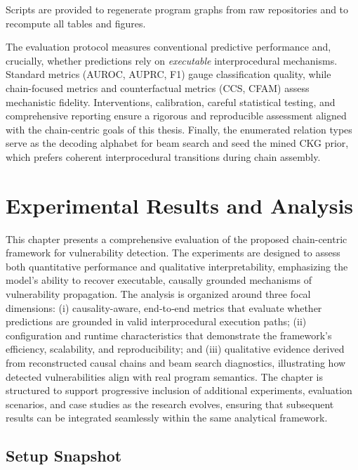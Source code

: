 \documentclass{buthesis}
\begin{document}
Scripts are provided to regenerate program graphs from raw repositories and to recompute all tables and figures.

\bigskip
\noindent
The evaluation protocol measures conventional predictive performance and, crucially, whether predictions rely on \emph{executable} interprocedural mechanisms. Standard metrics (AUROC, AUPRC, F1) gauge classification quality, while chain-focused metrics and counterfactual metrics (CCS, CFAM) assess mechanistic fidelity. Interventions, calibration, careful statistical testing, and comprehensive reporting ensure a rigorous and reproducible assessment aligned with the chain-centric goals of this thesis. Finally, the enumerated relation types serve as the decoding alphabet for beam search and seed the mined CKG prior, which prefers coherent interprocedural transitions during chain assembly.


\chapter{Experimental Results and Analysis}
\label{chap:results}


This chapter presents a comprehensive evaluation of the proposed chain-centric framework for vulnerability detection. The experiments are designed to assess both quantitative performance and qualitative interpretability, emphasizing the model’s ability to recover executable, causally grounded mechanisms of vulnerability propagation. The analysis is organized around three focal dimensions: (i) causality-aware, end‑to‑end metrics that evaluate whether predictions are grounded in valid interprocedural execution paths; (ii) configuration and runtime characteristics that demonstrate the framework’s efficiency, scalability, and reproducibility; and (iii) qualitative evidence derived from reconstructed causal chains and beam search diagnostics, illustrating how detected vulnerabilities align with real program semantics. The chapter is structured to support progressive inclusion of additional experiments, evaluation scenarios, and case studies as the research evolves, ensuring that subsequent results can be integrated seamlessly within the same analytical framework.


\section{Setup Snapshot}
\label{sec:results-setup}
\end{document}
